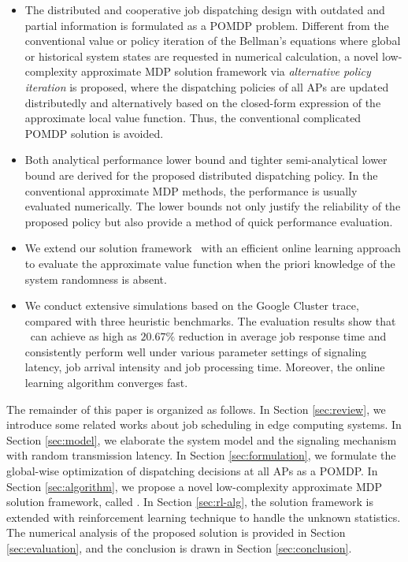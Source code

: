 \begin{itemize}
    \item The distributed and cooperative job dispatching design with outdated and partial information is formulated as a POMDP problem.
    Different from the conventional value or policy iteration of the Bellman's equations where global or historical system states are requested in numerical calculation, a novel low-complexity approximate MDP solution framework via \emph{alternative policy iteration} is proposed, where the dispatching policies of all APs are updated distributedly and alternatively based on the {closed-form expression} of the approximate local value function.
    Thus, the conventional complicated POMDP solution is avoided.
    \item Both analytical performance lower bound and tighter semi-analytical lower bound are derived for the proposed distributed dispatching policy. In the conventional approximate MDP methods, the performance is usually evaluated numerically.
    The lower bounds not only justify the reliability of the proposed policy but also provide a method of quick performance evaluation.
    \item We extend our solution framework \algname~with an efficient online learning approach to evaluate the approximate value function when the priori knowledge of the system randomness is absent.
    \item We conduct extensive simulations based on the Google Cluster trace, compared with three heuristic benchmarks. The evaluation results show that \algname~can achieve as high as $20.67\%$ reduction in average job response time and consistently perform well under various parameter settings of signaling latency, job arrival intensity and job processing time. {Moreover, the online learning algorithm converges fast.}
\end{itemize}


The remainder of this paper is organized as follows.
In Section \ref{sec:review}, we introduce some related works about job scheduling in edge computing systems.
In Section \ref{sec:model}, we elaborate the system model and the signaling mechanism with random transmission latency.
In Section \ref{sec:formulation}, we formulate the global-wise optimization of dispatching decisions at all APs as a POMDP.
In Section \ref{sec:algorithm}, we propose a novel low-complexity approximate MDP solution framework, called \algname.
In Section \ref{sec:rl-alg}, the solution framework is extended with reinforcement learning technique to handle the unknown statistics.
The numerical analysis of the proposed solution is provided in Section \ref{sec:evaluation}, and the conclusion is drawn in Section \ref{sec:conclusion}.

